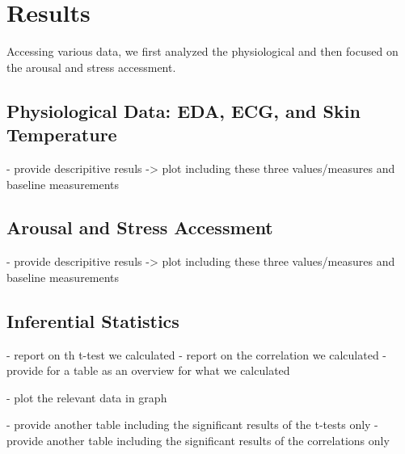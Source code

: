\section{Results}

Accessing various data, we first analyzed the physiological and then focused on the arousal and stress accessment. 

\subsection{Physiological Data: EDA, ECG, and Skin Temperature}
 
 - provide descripitive resuls -> plot including these three values/measures and baseline measurements 
 


\subsection{Arousal and Stress Accessment}

 - provide descripitive resuls -> plot including these three values/measures and baseline measurements 
 
 
\subsection{Inferential Statistics}

- report on th t-test we calculated 
- report on the correlation we calculated 
- provide for a table as an overview for what we calculated 

- plot the relevant data in graph 

- provide another table including the significant results of the t-tests only 
- provide another table including the significant results of the correlations only